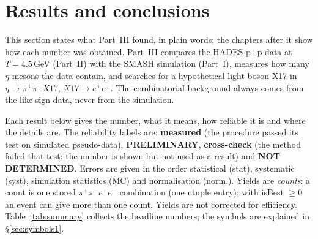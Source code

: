 \documentclass[11pt,a4paper]{article}
\newcommand{\ee}{\ensuremath{e^{+}e^{-}}\xspace}
\newcommand{\pipi}{\ensuremath{\pi^{+}\pi^{-}}\xspace}
\newcommand{\ppee}{\ensuremath{\pi^{+}\pi^{-}e^{+}e^{-}}\xspace}
\begin{document}
\setcounter{tocdepth}{1}%
\begingroup\setlength{\parskip}{0pt}\let\origaddvspace\addvspace\renewcommand{\addvspace}[1]{\origaddvspace{0.25em}}
\tableofcontents
\endgroup
\setcounter{tocdepth}{3}

\renewcommand{\floatpagefraction}{0.75}
\section{Results and conclusions}
\label{sec:results}
This section states what Part~III found, in plain words; the chapters after it show how each number was obtained. Part~III compares the
HADES p+p data at $T=4.5$\,GeV (Part~II) with the SMASH simulation (Part~I), measures how many $\eta$ mesons the data contain, and searches
for a hypothetical light boson X17 in $\eta\to\pipi X17$, $X17\to\ee$. The combinatorial background always comes from the like-sign data, never
from the simulation.

Each result below gives the number, what it means, how reliable it is and where the details are. The reliability labels are:
\textbf{measured} (the procedure passed its test on simulated pseudo-data), \textbf{PRELIMINARY}, \textbf{cross-check} (the method failed that
test; the number is shown but not used as a result) and \textbf{NOT DETERMINED}. Errors are given in the order statistical (stat), systematic
(syst), simulation statistics (MC) and normalisation (norm.). Yields are \emph{counts}: a count is one stored \ppee combination (one ntuple entry); with
isBest $\ge0$ an event can give more than one count. Yields are not corrected for efficiency. Table~\ref{tab:summary} collects the headline numbers; the symbols are explained in
\S\ref{sec:symbols1}.
\end{document}
